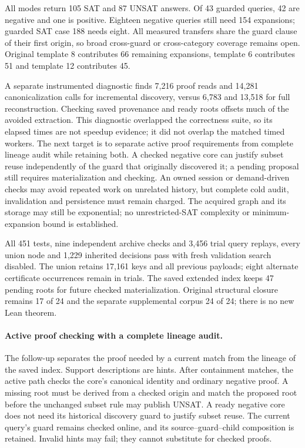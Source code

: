 \documentclass[11pt,a4paper]{article}
\numberwithin{equation}{section}
\theoremstyle{plain}
\theoremstyle{definition}
\theoremstyle{remark}
\begin{document}
All modes return 105 SAT and 87 UNSAT answers. Of 43 guarded queries, 42 are
negative and one is positive. Eighteen negative queries still need 154
expansions; guarded SAT case 188 needs eight. All measured transfers share the
guard clause of their first origin, so broad cross-guard or cross-category
coverage remains open. Original template 8 contributes 66 remaining expansions,
template 6 contributes 51 and template 12 contributes 45.

A separate instrumented diagnostic finds 7,216 proof reads and 14,281
canonicalization calls for incremental discovery, versus 6,783 and 13,518
for full reconstruction. Checking saved provenance and ready roots offsets
much of the avoided extraction. This diagnostic overlapped the correctness
suite, so its elapsed times are not speedup evidence; it did not overlap the
matched timed workers. The next target is to separate active proof requirements
from complete lineage audit while retaining both. A checked negative core can
justify subset reuse independently of the guard that originally discovered it;
a pending proposal still requires materialization and checking. An owned
session or demand-driven checks may avoid repeated work on unrelated history,
but complete cold audit, invalidation and persistence must remain charged.
The acquired graph and its storage may still be exponential; no unrestricted-SAT
complexity or minimum-expansion bound is established.

All 451 tests, nine independent archive checks and 3,456 trial query replays,
every union node and 1,229 inherited decisions pass with fresh validation search
disabled. The union retains 17,161 keys and all previous payloads; eight alternate
certificate occurrences remain in trials. The saved extended index keeps 47
pending roots for future checked materialization. Original structural closure
remains 17 of 24 and the separate supplemental corpus 24 of 24; there is no
new Lean theorem.

\paragraph{Active proof checking with a complete lineage audit.}
The follow-up separates the proof needed by a current match from the lineage
of the saved index. Support descriptions are hints. After containment matches,
the active path checks the core's canonical identity and ordinary negative proof.
A missing root must be derived from a checked origin and match the proposed root
before the unchanged subset rule may publish UNSAT. A ready negative core does
not need its historical discovery guard to justify subset reuse. The current
query's guard remains checked online, and its source--guard--child composition
is retained. Invalid hints may fail; they cannot substitute for checked proofs.
\end{document}
